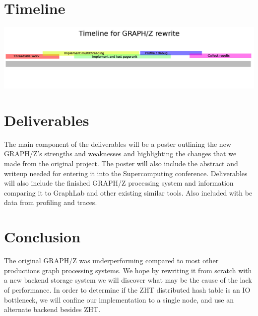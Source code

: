 \documentclass[10pt]{article}
\begin{document}
  \section{Timeline}
  \includegraphics[width=\textwidth]{timeline.png}
\begin{multicols}{2}
  \section{Deliverables}
   The main component of the deliverables will be a poster outlining the new GRAPH/Z's strengths and weaknesses and highlighting the changes that we made from the original project. The poster will also include the abstract and writeup needed for entering it into the Supercomputing conference.  Deliverables will also include the finished GRAPH/Z processing system and information comparing it to GraphLab and other existing similar tools. Also included with be data from profiling and traces. 
   \section{Conclusion}
   The original GRAPH/Z was underperforming compared to most other productions graph processing systems. We hope by rewriting it from scratch with a new backend storage system we will discover what may be the cause of the lack of performance. In order to determine if the ZHT distributed hash table is an IO bottleneck, we will confine our implementation to a single node, and use an alternate backend besides ZHT.


   
   
\end{multicols}
\end{document}
